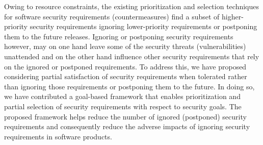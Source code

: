 Owing to resource constraints, the existing prioritization and selection techniques for software security requirements (countermeasures) find a subset of higher-priority security requirements ignoring lower-priority requirements or postponing them to the future releases. Ignoring or postponing security requirements however, may on one hand leave some of the security threats (vulnerabilities) unattended and on the other hand influence other security requirements that rely on the ignored or postponed requirements. To address this, we have proposed considering partial satisfaction of security requirements when tolerated rather than ignoring those requirements or postponing them to the future. In doing so, we have contributed a goal-based framework that enables prioritization and partial selection of security requirements with respect to security goals. The proposed framework helps reduce the number of ignored (postponed) security requirements and consequently reduce the adverse impacts of ignoring security requirements in software products.